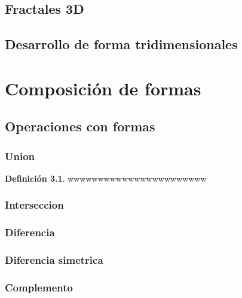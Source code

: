 \documentclass[
  16pt,
]{krantz}
\theoremstyle{definition}
\newtheorem{definition}{Definición}[chapter]
\theoremstyle{definition}
\theoremstyle{definition}
\theoremstyle{definition}
\theoremstyle{remark}
\begin{document}
\hypertarget{fractales-3d}{%
\section{Fractales 3D}\label{fractales-3d}}

\hypertarget{desarrollo-de-forma-tridimensionales}{%
\section{Desarrollo de forma tridimensionales}\label{desarrollo-de-forma-tridimensionales}}

\hypertarget{composiciuxf3n-de-formas}{%
\chapter{Composición de formas}\label{composiciuxf3n-de-formas}}

\hypertarget{operaciones-con-formas}{%
\section{Operaciones con formas}\label{operaciones-con-formas}}

\hypertarget{union}{%
\subsection{Union}\label{union}}

\begin{definition}
\protect\hypertarget{def:unnamed-chunk-1}{}\label{def:unnamed-chunk-1}wwwwwwwwwwwwwwwwwwwwwww
\end{definition}

\hypertarget{interseccion}{%
\subsection{Interseccion}\label{interseccion}}

\hypertarget{diferencia}{%
\subsection{Diferencia}\label{diferencia}}

\hypertarget{diferencia-simetrica}{%
\subsection{Diferencia simetrica}\label{diferencia-simetrica}}

\hypertarget{complemento}{%
\subsection{Complemento}\label{complemento}}
\end{document}
